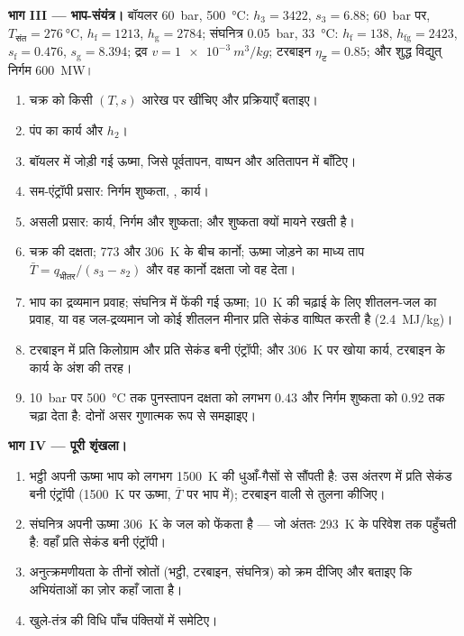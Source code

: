 \begin{problem}[{सप्ताहांत समस्या --- खुले-तंत्र संतुलनों से नापी गई
दो मशीनें}]
\textbf{भाग III --- भाप-संयंत्र।}
बॉयलर \qty{60}{bar}, \qty{500}{\celsius}: $h_3 = 3422$, $s_3 = 6.88$;
\qty{60}{bar} पर, $T_{\text{संत}} = \qty{276}{\celsius}$, $h_{\text{f}} = 1213$,
$h_{\text{g}} = 2784$; संघनित्र \qty{0.05}{bar}, \qty{33}{\celsius}:
$h_{\text{f}} = 138$, $h_{\text{fg}} = 2423$, $s_{\text{f}} = 0.476$, $s_{\text{g}} =
8.394$; द्रव $v = \qty{1e-3}{m^3/kg}$; टरबाइन $\eta_{\text{ट}} = 0.85$;
और शुद्ध विद्युत् निर्गम \qty{600}{MW}।
\begin{enumerate}[resume]
  \item चक्र को किसी $(T,s)$ आरेख पर खींचिए और प्रक्रियाएँ बताइए।
  \item पंप का कार्य और $h_2$।
  \item बॉयलर में जोड़ी गई ऊष्मा, जिसे पूर्वतापन, वाष्पन
        और अतितापन में बाँटिए।
  \item सम-एंट्रॉपी प्रसार: निर्गम शुष्कता, , कार्य।
  \item असली प्रसार: कार्य, निर्गम  और शुष्कता; और शुष्कता
        क्यों मायने रखती है।
  \item चक्र की दक्षता; \qty{773}{} और \qty{306}{K} के बीच कार्नो;
        ऊष्मा जोड़ने का माध्य ताप $\bar T = q_{\text{भीतर}}/(s_3
        - s_2)$ और वह कार्नो दक्षता जो वह देता।
  \item भाप का द्रव्यमान प्रवाह; संघनित्र में फेंकी गई ऊष्मा; \qty{10}{K}
        की चढ़ाई के लिए शीतलन-जल का प्रवाह, या वह जल-द्रव्यमान जो कोई शीतलन
        मीनार प्रति सेकंड वाष्पित करती है (\qty{2.4}{MJ/kg})।
  \item टरबाइन में प्रति किलोग्राम और प्रति सेकंड बनी एंट्रॉपी;
        और \qty{306}{K} पर खोया कार्य, टरबाइन के कार्य के
        अंश की तरह।
  \item \qty{10}{bar} पर \qty{500}{\celsius} तक पुनस्तापन दक्षता को
        लगभग $0.43$ और निर्गम शुष्कता को $0.92$ तक चढ़ा देता है:
        दोनों असर गुणात्मक रूप से समझाइए।
\end{enumerate}

\textbf{भाग IV --- पूरी शृंखला।}
\begin{enumerate}[resume]
  \item भट्ठी अपनी ऊष्मा भाप को लगभग \qty{1500}{K} की धुआँ-गैसों से
        सौंपती है: उस अंतरण में प्रति सेकंड बनी एंट्रॉपी
        (\qty{1500}{K} पर ऊष्मा, $\bar T$ पर भाप में); टरबाइन वाली से
        तुलना कीजिए।
  \item संघनित्र अपनी ऊष्मा \qty{306}{K} के जल को फेंकता है ---
        जो अंततः \qty{293}{K} के परिवेश तक पहुँचती है: वहाँ प्रति सेकंड
        बनी एंट्रॉपी।
  \item अनुत्क्रमणीयता के तीनों स्रोतों (भट्ठी, टरबाइन,
        संघनित्र) को क्रम दीजिए और बताइए कि अभियंताओं का ज़ोर कहाँ जाता है।
  \item खुले-तंत्र की विधि पाँच पंक्तियों में समेटिए।
\end{enumerate}
\end{problem}
